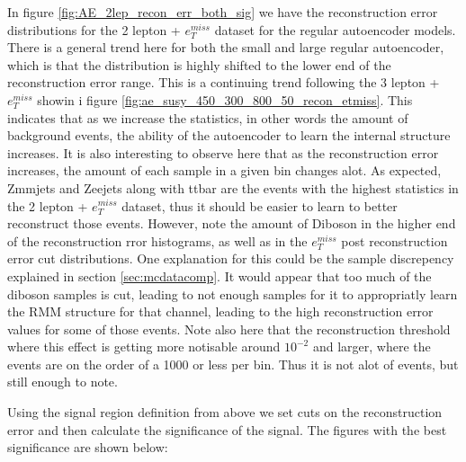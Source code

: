 In figure \ref{fig:AE_2lep_recon_err_both_sig} we have the reconstruction error distributions 
for the 2 lepton + $e_T^{miss}$ dataset for the regular autoencoder models. There is a general 
trend here for both the small and large regular autoencoder, which is that the distribution is 
highly shifted to the lower end of the reconstruction error range. This is a continuing trend 
following the 3 lepton + $e_T^{miss}$ showin i figure 
\ref{fig:ae_susy_450_300_800_50_recon_etmiss}. This indicates that as we increase the statistics, 
in other words the amount of background events, the ability of the autoencoder to learn the 
internal structure increases. It is also interesting to observe here that 
as the reconstruction error increases, the amount of each sample in a given bin changes alot. 
As expected, Zmmjets and Zeejets along with ttbar are the events with the highest statistics 
in the 2 lepton + $e_T^{miss}$ dataset, thus it should be easier to learn to better reconstruct 
those events. However, note the amount of Diboson in the higher end of the reconstruction 
rror histograms, as well as in the $e_T^{miss}$ post reconstruction error cut distributions. 
One explanation for this could be the sample discrepency explained in section 
\ref{sec:mcdatacomp}. It would appear that too much of the diboson samples is cut, leading to 
not enough samples for it to appropriatly learn the RMM structure for that channel, leading to 
the high reconstruction error values for some of those events. Note also here that the 
reconstruction threshold where this effect is getting more notisable around $10^{-2}$ and 
larger, where the events are on the order of a 1000 or less per bin. Thus it is not alot of 
events, but still enough to note. \par Using the signal region definition from above we set 
cuts on the reconstruction error and then calculate the significance of the signal. 
The figures with the best significance are shown below:

